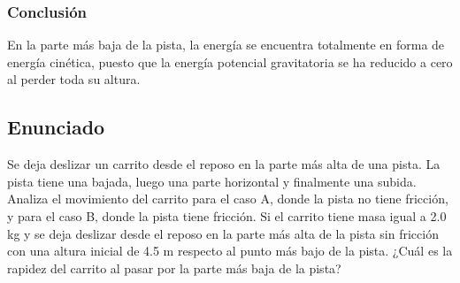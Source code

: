\documentclass[12pt,a4paper]{article}
\begin{document}
\subsubsection*{Conclusión}
En la parte más baja de la pista, la energía se encuentra totalmente en forma de energía cinética, puesto que la energía potencial gravitatoria se ha reducido a cero al perder toda su altura.

\newpage

\subsection*{Enunciado}
Se deja deslizar un carrito desde el reposo en la parte más alta de una pista. La pista tiene una bajada, luego una parte horizontal y finalmente una subida. Analiza el movimiento del carrito para el caso A, donde la pista no tiene fricción, y para el caso B, donde la pista tiene fricción. Si el carrito tiene masa igual a 2.0 kg y se deja deslizar desde el reposo en la parte más alta de la pista sin fricción con una altura inicial de 4.5 m respecto al punto más bajo de la pista. ¿Cuál es la rapidez del carrito al pasar por la parte más baja de la pista?
\end{document}
